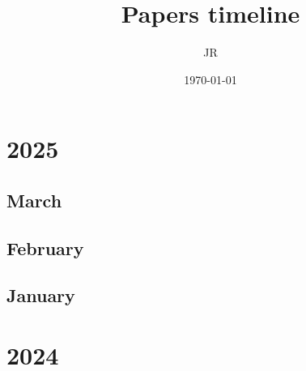 \documentclass[12pt]{article}
\begin{document}
\title{\Large Papers timeline}
\author{JR}
\date{\today}
\maketitle

\tableofcontents

\newpage
\section{2025}

\subsection{March}
\begin{refsection}
    \nocite{jiang2025tokenefficientlongvideounderstanding}
    \printbibliography[heading=none]
\end{refsection}

\subsection{February}


\subsection{January}

\section{2024}

\end{document}
